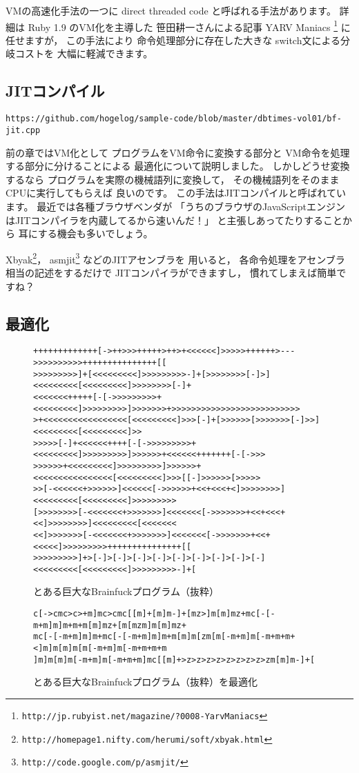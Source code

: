 VMの高速化手法の一つに
direct threaded code
と呼ばれる手法があります。
詳細は
Ruby 1.9
のVM化を主導した
笹田耕一さんによる記事
YARV Maniacs
\footnote{\verb|http://jp.rubyist.net/magazine/?0008-YarvManiacs|}
に任せますが，
この手法により
命令処理部分に存在した大きな
switch文による分岐コストを
大幅に軽減できます。

\subsection{JITコンパイル}
{\scriptsize
\verb|https://github.com/hogelog/sample-code/blob/master/dbtimes-vol01/bf-jit.cpp|
}

前の章ではVM化として
プログラムをVM命令に変換する部分と
VM命令を処理する部分に分けることによる
最適化について説明しました。
しかしどうせ変換するなら
プログラムを実際の機械語列に変換して，
その機械語列をそのままCPUに実行してもらえば
良いのです。
この手法はJITコンパイルと呼ばれています。
最近では各種ブラウザベンダが
「うちのブラウザのJavaScriptエンジンはJITコンパイラを内蔵してるから速いんだ！」
と主張しあってたりすることから
耳にする機会も多いでしょう。

Xbyak\footnote{
\verb|http://homepage1.nifty.com/herumi/soft/xbyak.html|
}，
asmjit\footnote{
\verb|http://code.google.com/p/asmjit/|
}
などのJITアセンブラを
用いると，
各命令処理をアセンブラ相当の記述をするだけで
JITコンパイラができますし，
慣れてしまえば簡単ですね？

\subsection{最適化}
\begin{figure}[hbt]
{\scriptsize
\begin{verbatim}
+++++++++++++[->++>>>+++++>++>+<<<<<<]>>>>>++++++>--->>>>>>>>>>+++++++++++++++[[
>>>>>>>>>]+[<<<<<<<<<]>>>>>>>>>-]+[>>>>>>>>[-]>]<<<<<<<<<[<<<<<<<<<]>>>>>>>>[-]+
<<<<<<<+++++[-[->>>>>>>>>+<<<<<<<<<]>>>>>>>>>]>>>>>>>+>>>>>>>>>>>>>>>>>>>>>>>>>>
>+<<<<<<<<<<<<<<<<<[<<<<<<<<<]>>>[-]+[>>>>>>[>>>>>>>[-]>>]<<<<<<<<<[<<<<<<<<<]>>
>>>>>[-]+<<<<<<++++[-[->>>>>>>>>+<<<<<<<<<]>>>>>>>>>]>>>>>>+<<<<<<+++++++[-[->>>
>>>>>>+<<<<<<<<<]>>>>>>>>>]>>>>>>+<<<<<<<<<<<<<<<<[<<<<<<<<<]>>>[[-]>>>>>>[>>>>>
>>[-<<<<<<+>>>>>>]<<<<<<[->>>>>>+<<+<<<+<]>>>>>>>>]<<<<<<<<<[<<<<<<<<<]>>>>>>>>>
[>>>>>>>>[-<<<<<<<+>>>>>>>]<<<<<<<[->>>>>>>+<<+<<<+<<]>>>>>>>>]<<<<<<<<<[<<<<<<<
<<]>>>>>>>[-<<<<<<<+>>>>>>>]<<<<<<<[->>>>>>>+<<+<<<<<]>>>>>>>>>+++++++++++++++[[
>>>>>>>>>]+>[-]>[-]>[-]>[-]>[-]>[-]>[-]>[-]>[-]<<<<<<<<<[<<<<<<<<<]>>>>>>>>>-]+[
\end{verbatim}
}
\caption{とある巨大なBrainfuckプログラム（抜粋）}
\label{mandelbrot.b}
\end{figure}
\begin{figure}[hbt]
{\scriptsize
\begin{verbatim}
c[->cmc>c>+m]mc>cmc[[m]+[m]m-]+[mz>]m[m]mz+mc[-[-m+m]m]m+m+m[m]mz+[m[mzm]m[m]mz+
mc[-[-m+m]m]m+mc[-[-m+m]m]m+m[m]m[zm[m[-m+m]m[-m+m+m+<]m]m[m]m[m[-m+m]m[-m+m+m+m
]m]m[m]m[-m+m]m[-m+m+m]mc[[m]+>z>z>z>z>z>z>z>z>zm[m]m-]+[
\end{verbatim}
}
\caption{とある巨大なBrainfuckプログラム（抜粋）を最適化}
\label{mandelbrot.b:opt}
\end{figure}


